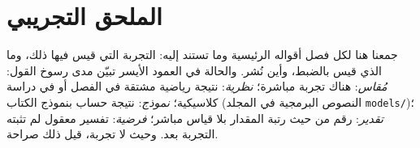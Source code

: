 \chapter{الملحق التجريبي}
\label{sec:supplement}

جمعنا هنا لكل فصل أقواله الرئيسية وما تستند إليه: التجربة التي قيس فيها ذلك، وما الذي قيس بالضبط، وأين نُشر. والحالة في العمود الأيسر تبيّن مدى رسوخ القول: \emph{مُقاس}: هناك تجربة مباشرة؛ \emph{نظرية}: نتيجة رياضية مشتقة في الفصل أو في دراسة كلاسيكية؛ \emph{نموذج}: نتيجة حساب بنموذج الكتاب (النصوص البرمجية في المجلد \foreignlanguage{english}{\texttt{models/}})؛ \emph{تقدير}: رقم من حيث رتبة المقدار بلا قياس مباشر؛ \emph{فرضية}: تفسير معقول لم تثبته التجربة بعد. وحيث لا تجربة، قيل ذلك صراحة.























